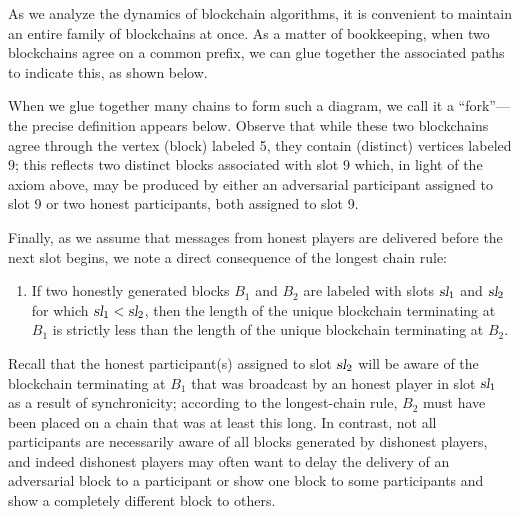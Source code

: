 As we analyze the dynamics of blockchain algorithms, it is convenient
to maintain an entire family of blockchains at once. As a matter of
bookkeeping, when two blockchains agree on a common prefix, we can
glue together the associated paths to indicate this, as shown
below.
\begin{center}
  \end{center}
  When we glue together many chains to form such a diagram, we call it
  a ``fork''---the precise definition appears below. Observe that
  while these two blockchains agree through the vertex (block) labeled
  5, they contain (distinct) vertices labeled 9; this reflects two
  distinct blocks associated with slot 9 which, in light of the axiom
  above, 
  may be produced by either an adversarial participant assigned to slot 9 or 
  two honest participants, both assigned to slot 9.
  
  Finally, as we assume that messages from honest players are
  delivered before the next slot begins, we note a direct consequence of the longest
  chain rule:
\begin{enumerate}[label={\textbf{A\arabic*}}., ref={\textbf{A\arabic*}}, resume=axiom]
  \item\label{axiom:honest-depth} 
  If two honestly generated blocks $B_1$ and $B_2$ are labeled
  with slots $\textsl{sl}_1$ and $\textsl{sl}_2$ for which $\textsl{sl}_1 < \textsl{sl}_2$,
  then the length of the unique blockchain terminating at $B_1$ is
  strictly less than the length of the unique blockchain terminating at $B_2$.
\end{enumerate}
Recall that the honest participant(s) assigned to slot
$\textsl{sl}_2$ will be aware of the blockchain terminating at $B_1$ that
was broadcast by an honest player in slot $\textsl{sl}_1$ as a result of
synchronicity; according to the longest-chain rule, 
$B_2$ must have been placed on a chain that was at least this long. In contrast, not
all participants are necessarily aware of all blocks generated by
dishonest players, and indeed dishonest players may often want to
delay the delivery of an adversarial block to a participant or show
one block to some participants and show a completely different block
to others.

